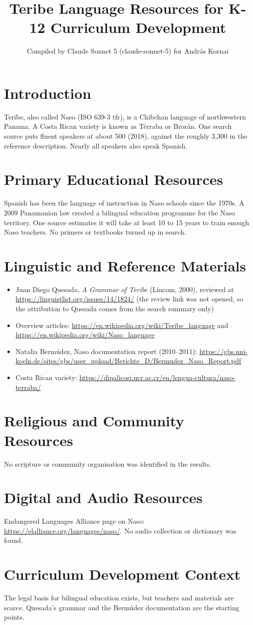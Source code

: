 \documentclass[12pt]{article}
\title{Teribe Language Resources for K-12 Curriculum Development}
\author{Compiled by Claude Sonnet 5 (claude-sonnet-5) for Andr\'as Kornai}
\date{}
\begin{document}
\maketitle
\section{Introduction}
Teribe, also called Naso (ISO 639-3 tfr), is a Chibchan language of northwestern Panama. A Costa Rican variety is known as T\'erraba or Bror\'an. One search source puts fluent speakers at about 500 (2018), against the roughly 3,300 in the reference description. Nearly all speakers also speak Spanish.
\section{Primary Educational Resources}
Spanish has been the language of instruction in Naso schools since the 1970s. A 2009 Panamanian law created a bilingual education programme for the Naso territory. One source estimates it will take at least 10 to 15 years to train enough Naso teachers. No primers or textbooks turned up in search.
\section{Linguistic and Reference Materials}
\begin{itemize}
\item Juan Diego Quesada, \emph{A Grammar of Teribe} (Lincom, 2000), reviewed at \url{https://linguistlist.org/issues/14/1824/} (the review link was not opened, so the attribution to Quesada comes from the search summary only)
\item Overview articles: \url{https://en.wikipedia.org/wiki/Teribe_language} and \url{https://en.wikipedia.org/wiki/Naso_language}
\item Natalia Berm\'udez, Naso documentation report (2010--2011): \url{https://gbs.uni-koeln.de/sites/gbs/user_upload/Berichte_D/Bermudez_Naso_Report.pdf}
\item Costa Rican variety: \url{https://dipalicori.ucr.ac.cr/en/lengua-cultura/naso-terraba/}
\end{itemize}
\section{Religious and Community Resources}
No scripture or community organisation was identified in the results.
\section{Digital and Audio Resources}
Endangered Languages Alliance page on Naso: \url{https://elalliance.org/languages/naso/}. No audio collection or dictionary was found.
\section{Curriculum Development Context}
The legal basis for bilingual education exists, but teachers and materials are scarce. Quesada's grammar and the Berm\'udez documentation are the starting points.
\end{document}
